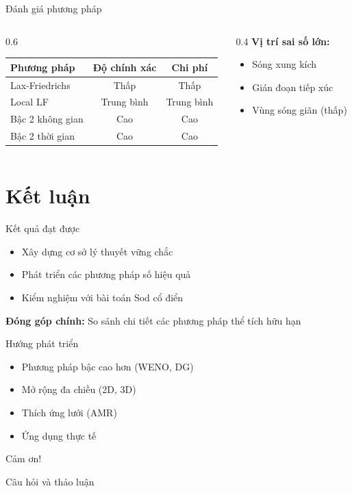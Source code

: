 \documentclass[aspectratio=169,22pt]{beamer}
\begin{document}
\begin{frame}{Đánh giá phương pháp}
\begin{columns}[T]
\begin{column}{0.6\textwidth}
\begin{table}
\centering
\begin{tabular}{|l|c|c|}
\hline
\textbf{Phương pháp} & \textbf{Độ chính xác} & \textbf{Chi phí} \\
\hline
Lax-Friedrichs & Thấp & Thấp \\
\hline
Local LF & Trung bình & Trung bình \\
\hline
Bậc 2 không gian & Cao & Cao \\
\hline
Bậc 2 thời gian & Cao & Cao \\
\hline
\end{tabular}
\end{table}
\end{column}
\begin{column}{0.4\textwidth}
\textbf{Vị trí sai số lớn:}
\begin{itemize}
\item Sóng xung kích
\item Gián đoạn tiếp xúc
\item Vùng sóng giãn (thấp)
\end{itemize}
\end{column}
\end{columns}
\end{frame}

\section{Kết luận}

\begin{frame}{Kết quả đạt được}
\begin{itemize}
\item Xây dựng cơ sở lý thuyết vững chắc
\item Phát triển các phương pháp số hiệu quả
\item Kiểm nghiệm với bài toán Sod cổ điển
\end{itemize}

\vspace{1cm}
\textbf{Đóng góp chính:} So sánh chi tiết các phương pháp thể tích hữu hạn
\end{frame}

\begin{frame}{Hướng phát triển}
\begin{itemize}
\item Phương pháp bậc cao hơn (WENO, DG)
\item Mở rộng đa chiều (2D, 3D)
\item Thích ứng lưới (AMR)
\item Ứng dụng thực tế
\end{itemize}
\end{frame}

\begin{frame}
\begin{center}
\Huge Cảm ơn!

\vspace{2cm}

\Large Câu hỏi và thảo luận
\end{center}
\end{frame}
\end{document}

